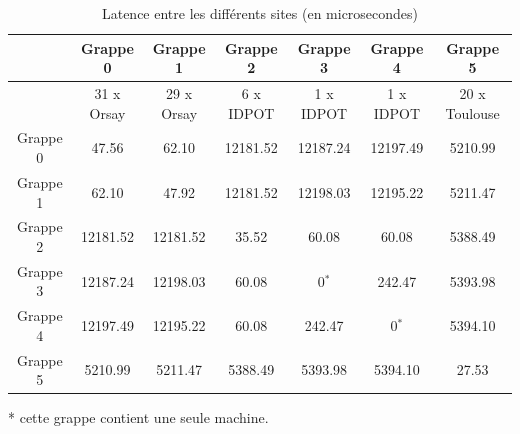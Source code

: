 %
\begin{table}
	\caption{\label{Tableau: Latence grid 1}Latence entre les différents sites
		(en microsecondes)}
	
	
	\begin{centering}
		{\footnotesize }\begin{tabular}{|c||c|c|c|c|c|c|}
			\hline 
			& {\footnotesize Grappe 0} & {\footnotesize Grappe 1} & {\footnotesize Grappe 2} & {\footnotesize Grappe 3} & {\footnotesize Grappe 4} & {\footnotesize Grappe 5}\tabularnewline
			\hline 
			& {\footnotesize 31 x Orsay} & {\footnotesize 29 x Orsay} & {\footnotesize 6 x IDPOT} & {\footnotesize 1 x IDPOT} & {\footnotesize 1 x IDPOT} & {\footnotesize 20 x Toulouse}\tabularnewline
			\hline
			\hline 
			{\footnotesize Grappe 0} & {\footnotesize 47.56} & {\footnotesize 62.10} & {\footnotesize 12181.52} & {\footnotesize 12187.24} & {\footnotesize 12197.49} & {\footnotesize 5210.99}\tabularnewline
			\hline 
			{\footnotesize Grappe 1} & {\footnotesize 62.10} & {\footnotesize 47.92} & {\footnotesize 12181.52} & {\footnotesize 12198.03} & {\footnotesize 12195.22} & {\footnotesize 5211.47}\tabularnewline
			\hline 
			{\footnotesize Grappe 2} & {\footnotesize 12181.52} & {\footnotesize 12181.52} & {\footnotesize 35.52} & {\footnotesize 60.08} & {\footnotesize 60.08} & {\footnotesize 5388.49}\tabularnewline
			\hline 
			{\footnotesize Grappe 3} & {\footnotesize 12187.24} & {\footnotesize 12198.03} & {\footnotesize 60.08} & {\footnotesize 0$^{*}$} & {\footnotesize 242.47} & {\footnotesize 5393.98}\tabularnewline
			\hline 
			{\footnotesize Grappe 4} & {\footnotesize 12197.49} & {\footnotesize 12195.22} & {\footnotesize 60.08} & {\footnotesize 242.47} & {\footnotesize 0$^{*}$} & {\footnotesize 5394.10}\tabularnewline
			\hline 
			{\footnotesize Grappe 5} & {\footnotesize 5210.99} & {\footnotesize 5211.47} & {\footnotesize 5388.49} & {\footnotesize 5393.98} & {\footnotesize 5394.10} & {\footnotesize 27.53}\tabularnewline
			\hline
		\end{tabular}
		\par\end{centering}{\footnotesize \par}
	
	\begin{centering}
		{\footnotesize {*} cette grappe contient une seule machine.}
		\par\end{centering}
\end{table}


